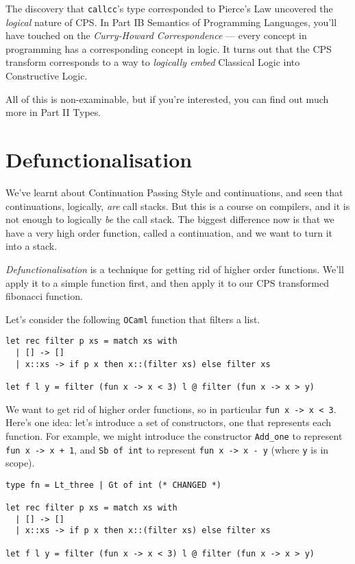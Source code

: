 The discovery that \texttt{callcc}'s type corresponded to Pierce's Law uncovered the \emph{logical} nature of CPS. In {\sffamily Part IB Semantics of Programming Languages}, you'll have touched on the \emph{Curry-Howard Correspondence} --- every concept in programming has a corresponding concept in logic. It turns out that the CPS transform corresponds to a way to \emph{logically embed} Classical Logic into Constructive Logic.

All of this is non-examinable, but if you're interested, you can find out much more in {\sffamily Part II Types}.

\section{Defunctionalisation}
We've learnt about Continuation Passing Style and continuations, and seen that continuations, logically, \emph{are} call stacks. But this is a course on compilers, and it is not enough to logically \emph{be} the call stack. The biggest difference now is that we have a very high order function, called a continuation, and we want to turn it into a stack. 

\emph{Defunctionalisation} is a technique for getting rid of higher order functions. We'll apply it to a simple function first, and then apply it to our CPS transformed fibonacci function. 

Let's consider the following \texttt{OCaml} function that filters a list.

\begin{code}
\label{code:defun-0}
\begin{verbatim}
let rec filter p xs = match xs with
  | [] -> []
  | x::xs -> if p x then x::(filter xs) else filter xs

let f l y = filter (fun x -> x < 3) l @ filter (fun x -> x > y)
\end{verbatim}
\end{code}

We want to get rid of higher order functions, so in particular \texttt{fun x -> x < 3}. Here's one idea: let's introduce a set of constructors, one that represents each function. For example, we might introduce the constructor \texttt{Add\_one} to represent \texttt{fun x -> x + 1}, and \texttt{Sb of int} to represent \texttt{fun x -> x - y} (where \texttt{y} is in scope).

\begin{code}
\label{code:defun-1}
\begin{verbatim}
type fn = Lt_three | Gt of int (* CHANGED *)

let rec filter p xs = match xs with
  | [] -> []
  | x::xs -> if p x then x::(filter xs) else filter xs

let f l y = filter (fun x -> x < 3) l @ filter (fun x -> x > y)
\end{verbatim}
\end{code}

